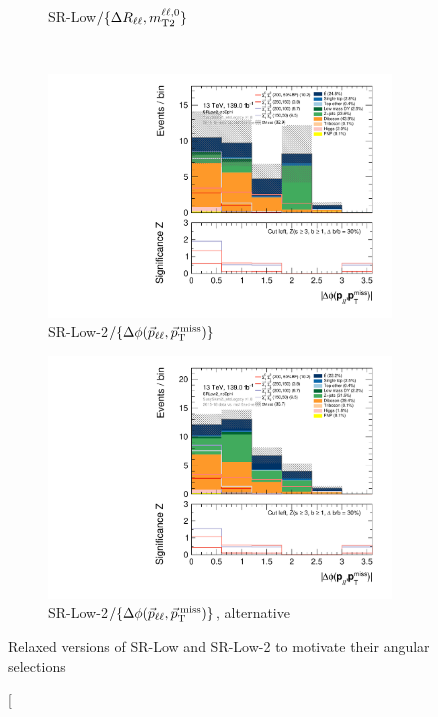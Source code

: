 \begin{figure}[tp]
\begin{subfigure}{0.48\textwidth}
\caption{SR-Low$/\{\Delta R_{\ell\ell},m_\mathrm{T2}^{\ell\ell,0}\}$}
\label{fig:2ljets_low_minus_norll_nomt2_mt2}
\end{subfigure}
\\[0.5em]
\begin{subfigure}{0.48\textwidth}
\centering
\includegraphics[width=\textwidth]{figures/2ljets_low_absdPhiPllMet_SRLow2_noDphi.pdf}
\caption{SR-Low-2$/\{\Delta\phi(\vec p_{\ell\ell}, \vec p_\mathrm{T}^\mathrm{\:miss})\}$}
\label{fig:2ljets_low_minus_dphi}
\end{subfigure}
\hfill
\begin{subfigure}{0.48\textwidth}
\centering
\includegraphics[width=\textwidth]{figures/2ljets_low_absdPhiPllMet_SRLow2_noDphi_mg5.pdf}
\caption{SR-Low-2$/\{\Delta\phi(\vec p_{\ell\ell}, \vec p_\mathrm{T}^\mathrm{\:miss})\}$, alternative}
\label{fig:2ljets_low_minus_dphi_alt}
\end{subfigure}
\caption[
Relaxed versions of SR-Low and SR-Low-2 to motivate their angular selections

\end{figure}
